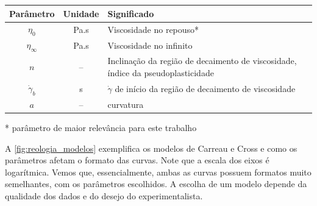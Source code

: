 			\begin{table}[h]
				{%
					\begin{tabular}{c c p{9cm}}
						\toprule
						    Parâmetro      & Unidade   & Significado                                                                      \\ \midrule
						    \(\eta_0\)     & Pa.s      & Viscosidade no repouso*                                                          \\
						\(\eta_{\infty}\)  & Pa.s      & Viscosidade no infinito                                                          \\
						      \(n\)        & --        & Inclinação da região de decaimento de viscosidade, índice da pseudoplasticidade  \\
						\(\dot{\gamma}_b\) & s\menosUm & \(\dot{\gamma}\) de início da região de decaimento de viscosidade                \\ \midrule
						      \(a\)        & --        & curvatura                                                                        \\ \bottomrule
					\end{tabular}%
				}{\small{* parâmetro de maior relevância para este trabalho}}
			\end{table}
			
			A \autoref{fig:reologia_modelos} exemplifica os modelos de Carreau e Cross e como os parâmetros afetam o formato das curvas. Note que a escala dos eixos é logarítmica. Vemos que, essencialmente, ambas as curvas possuem formatos muito semelhantes, com os parâmetros escolhidos. A escolha de um modelo depende da qualidade dos dados e do desejo do experimentalista.
			

